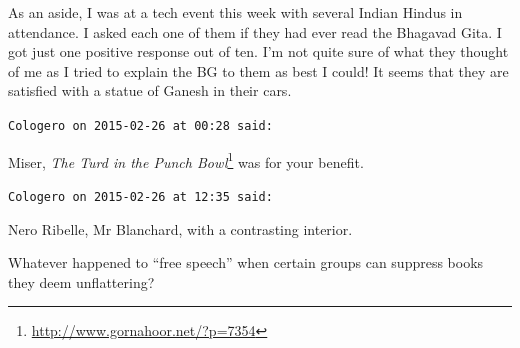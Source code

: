 \begin{footnotesize}
\begin{sffamily}
As an aside, I was at a tech event this week with several Indian Hindus in attendance. I asked each one of them if they had ever read the Bhagavad Gita. I got just one positive response out of ten. I'm not quite sure of what they thought of me as I tried to explain the BG to them as best I could! It seems that they are satisfied with a statue of Ganesh in their cars.

\hfill

\texttt{Cologero on 2015-02-26 at 00:28 said:}

Miser, \textit{The Turd in the Punch Bowl}\footnote{\url{http://www.gornahoor.net/?p=7354}} was for your benefit.

\hfill

\texttt{Cologero on 2015-02-26 at 12:35 said:}

Nero Ribelle, Mr Blanchard, with a contrasting interior.

Whatever happened to ``free speech'' when certain groups can suppress books they deem unflattering?

\end{sffamily}
\end{footnotesize}

